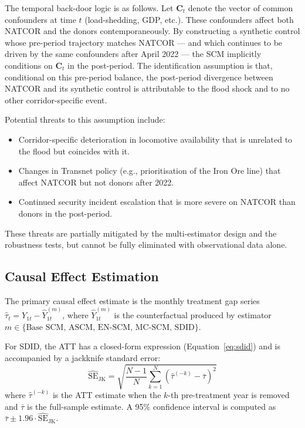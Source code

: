 The temporal back-door logic is as follows.
Let $\mathbf{C}_t$ denote the vector of common confounders at time
$t$ (load-shedding, GDP, etc.).
These confounders affect both NATCOR and the donors
contemporaneously.
By constructing a synthetic control whose pre-period trajectory
matches NATCOR --- and which continues to be driven by the same
confounders after April 2022 --- the SCM implicitly conditions on
$\mathbf{C}_t$ in the post-period.
The identification assumption is that, conditional on this
pre-period balance, the post-period divergence between NATCOR and
its synthetic control is attributable to the flood shock and to no
other corridor-specific event.

Potential threats to this assumption include:
\begin{itemize}
  \item Corridor-specific deterioration in locomotive availability
        that is unrelated to the flood but coincides with it.
  \item Changes in Transnet policy (e.g., prioritisation of the
        Iron Ore line) that affect NATCOR but not donors after 2022.
  \item Continued security incident escalation that is more severe
        on NATCOR than donors in the post-period.
\end{itemize}
These threats are partially mitigated by the multi-estimator design
and the robustness tests, but cannot be fully eliminated with
observational data alone.

\subsection{Causal Effect Estimation}
\label{sec:estimation}

The primary causal effect estimate is the monthly treatment gap
series $\hat{\tau}_t = Y_{1t} - \hat{Y}_{1t}^{(m)}$, where
$\hat{Y}_{1t}^{(m)}$ is the counterfactual produced by estimator
$m \in \{\text{Base SCM, ASCM, EN-SCM, MC-SCM, SDID}\}$.

For SDID, the ATT has a closed-form expression
(Equation~\ref{eq:sdid}) and is accompanied by a jackknife
standard error:
\begin{equation}
  \widehat{\text{SE}}_{\text{JK}} = \sqrt{\frac{N-1}{N}
    \sum_{k=1}^{N}\!\left(\hat{\tau}^{(-k)} - \bar{\tau}\right)^2}
\end{equation}
where $\hat{\tau}^{(-k)}$ is the ATT estimate when the $k$-th
pre-treatment year is removed and $\bar{\tau}$ is the full-sample
estimate.
A 95\% confidence interval is computed as
$\bar{\tau} \pm 1.96 \cdot \widehat{\text{SE}}_{\text{JK}}$.

